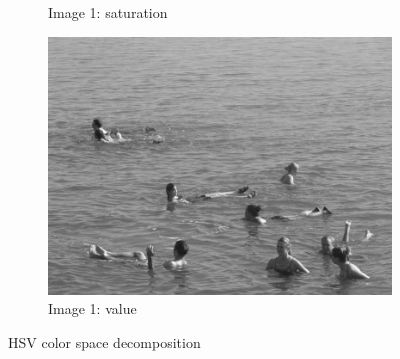 \begin{figure}
\begin{subfigure}[b]{0.3\textwidth}
                \caption{Image 1: saturation}
                \label{fig:final}
        \end{subfigure}
        \quad
        \begin{subfigure}[b]{0.3\textwidth}
                \includegraphics[width=\textwidth]{Images/val}
                \caption{Image 1: value}
                \label{fig:final}
        \end{subfigure}
        \caption{HSV color space decomposition}
\end{figure}

